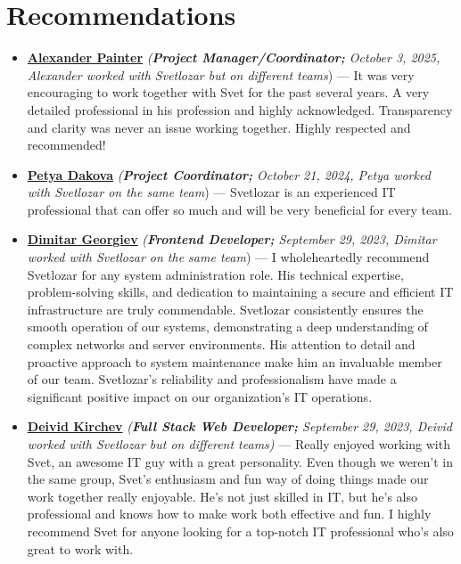 \documentclass[letterpaper, 10pt]{article}
\begin{document}
	\section*{Recommendations}
\begin{itemize}
	
			\item \textbf{\href{https://www.linkedin.com/in/alexander-painter-46281b25b/}{Alexander Painter}} \textit{(\textbf{Project Manager/Coordinator;} October 3, 2025, Alexander worked with Svetlozar but on different teams}) — It was very encouraging to work together with Svet for the past several years. A very detailed professional in his profession and highly acknowledged. Transparency and clarity was never an issue working together. Highly respected and recommended! \\
	
		\item \textbf{\href{https://www.linkedin.com/in/petya-dakova-3b37162a2/}{Petya Dakova}} \textit{(\textbf{Project Coordinator;} October 21, 2024, Petya worked with Svetlozar on the same team}) — Svetlozar is an experienced IT professional that can offer so much and will be very beneficial for every team. \\
	
	\item \textbf{\href{https://www.linkedin.com/in/dimitar-georgiev-29a6ab144/}{Dimitar
			Georgiev}} \textit{(\textbf{Frontend Developer;} September 29, 2023, Dimitar worked with Svetlozar on the same team}) — I wholeheartedly recommend Svetlozar for any system
	administration role. His technical expertise, problem-solving skills, and dedication
	to maintaining a secure and efficient IT infrastructure are truly commendable.
	Svetlozar consistently ensures the smooth operation of our systems, demonstrating
	a deep understanding of complex networks and server environments. His
	attention to detail and proactive approach to system maintenance make him
	an invaluable member of our team. Svetlozar’s reliability and professionalism
	have made a significant positive impact on our organization’s IT operations.\\
	
	\item \textbf{\href{https://www.linkedin.com/in/deivid-kirchev-00378b252/}{Deivid
			Kirchev}} \textit{(\textbf{Full Stack Web Developer;} September 29, 2023, Deivid worked with Svetlozar but on different teams)} — Really enjoyed working with Svet, an awesome IT guy with a great
	personality. Even though we weren’t in the same group, Svet’s enthusiasm and
	fun way of doing things made our work together really enjoyable. He’s not
	just skilled in IT, but he’s also professional and knows how to make work both
	effective and fun. I highly recommend Svet for anyone looking for a top-notch
	IT professional who’s also great to work with.\\
	

\end{itemize}
\end{document}
